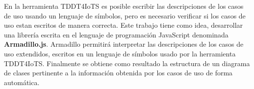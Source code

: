 En la herramienta TDDT4IoTS \parencite{tddt4iots} es posible escribir las descripciones de los casos de uso usando un lenguaje de símbolos, pero es necesario verificar si los casos de uso estan escritos de manera correcta. Este trabajo tiene como idea, desarrollar una librería escrita en el lenguaje de programación JavaScript denominada \textbf{Armadillo.js}. Armadillo permitirá interpretar las descripciones de los casos de uso extendidos, escritos en un lenguaje de símbolos usado por la herramienta TDDT4IoTS. Finalmente se obtiene como resultado la estructura de un diagrama de clases pertinente a la información obtenida por los casos de uso de forma automática.

